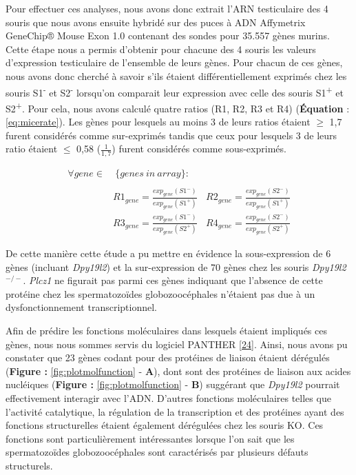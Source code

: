 \documentclass[12pt,twoside]{ugathesis}
\begin{document}
Pour effectuer ces analyses, nous avons donc extrait l'ARN testiculaire
des 4 souris que nous avons ensuite hybridé sur des puces à ADN
Affymetrix GeneChip® Mouse Exon 1.0 contenant des sondes pour 35.557
gènes murins. Cette étape nous a permis d'obtenir pour chacune des 4
souris les valeurs d'expression testiculaire de l'ensemble de leurs
gènes. Pour chacun de ces gènes, nous avons donc cherché à savoir s'ils
étaient différentiellement exprimés chez les souris
S1\textsuperscript{-} et S2\textsuperscript{-} lorsqu'on comparait leur
expression avec celle des souris S1\textsuperscript{+} et
S2\textsuperscript{+}. Pour cela, nous avons calculé quatre ratios (R1,
R2, R3 et R4) (\textbf{Équation} : \eqref{eq:micerate}). Les gènes pour
lesquels au moins 3 de leurs ratios étaient \(\ge\) 1,7 furent
considérés comme sur-exprimés tandis que ceux pour lesquels 3 de leurs
ratio étaient \(\le\) 0,58 (\(\frac{1}{1,7}\)) furent considérés comme
sous-exprimés.

\begin{equation} 
\begin{split}
\forall gene \in & \ \{genes\ in\ array\}: \\
\\
& R1_{gene} = \frac{exp_{gene}(S1^-)}{exp_{gene}(S1^+)} \ \ \ \ R2_{gene} = \frac{exp_{gene}(S2^-)}{exp_{gene}(S1^+)} \\
& R3_{gene} = \frac{exp_{gene}(S1^-)}{exp_{gene}(S2^+)} \ \ \ \ R4_{gene} = \frac{exp_{gene}(S2^-)}{exp_{gene}(S2^+)} 
\label{eq:micerate}
\end{split}
\end{equation}

De cette manière cette étude a pu mettre en évidence la sous-expression
de 6 gènes (incluant \emph{Dpy19l2}) et la sur-expression de 70 gènes
chez les souris \emph{Dpy19l2}\(^{-/-}\). \emph{Plcz1} ne figurait pas
parmi ces gènes indiquant que l'absence de cette protéine chez les
spermatozoïdes globozoocéphales n'étaient pas due à un dysfonctionnement
transcriptionnel.

Afin de prédire les fonctions moléculaires dans lesquels étaient
impliqués ces gènes, nous nous sommes servis du logiciel PANTHER
{[}\protect\hyperlink{ref-Mi2017}{24}{]}. Ainsi, nous avons pu constater
que 23 gènes codant pour des protéines de liaison étaient dérégulés
(\textbf{Figure : }\ref{fig:plotmolfunction} - \textbf{A}), dont sont
des protéines de liaison aux acides nucléiques (\textbf{Figure :
}\ref{fig:plotmolfunction} - \textbf{B}) suggérant que \emph{Dpy19l2}
pourrait effectivement interagir avec l'ADN. D'autres fonctions
moléculaires telles que l'activité catalytique, la régulation de la
transcription et des protéines ayant des fonctions structurelles étaient
également dérégulées chez les souris KO. Ces fonctions sont
particulièrement intéressantes lorsque l'on sait que les spermatozoïdes
globozoocéphales sont caractérisés par plusieurs défauts structurels.
\end{document}
